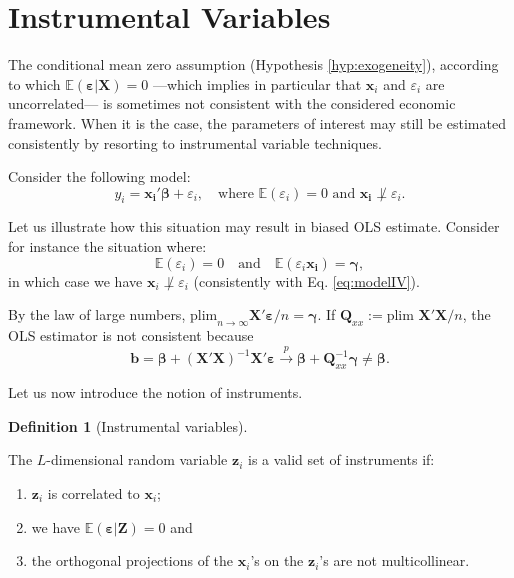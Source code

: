 \documentclass[
  12pt,
]{book}
\providecommand{\tightlist}{%
  \setlength{\itemsep}{0pt}\setlength{\parskip}{0pt}}
\theoremstyle{definition}
\newtheorem{definition}{Definition}[chapter]
\theoremstyle{definition}
\theoremstyle{definition}
\theoremstyle{definition}
\theoremstyle{remark}
\begin{document}
\hypertarget{IV}{%
\section{Instrumental Variables}\label{IV}}

The conditional mean zero assumption (Hypothesis \ref{hyp:exogeneity}), according to which \(\mathbb{E}(\boldsymbol\varepsilon|\mathbf{X})=0\) ---which implies in particular that \(\mathbf{x}_i\) and \(\varepsilon_i\) are uncorrelated--- is sometimes not consistent with the considered economic framework. When it is the case, the parameters of interest may still be estimated consistently by resorting to instrumental variable techniques.

Consider the following model:
\begin{equation}
y_i = \mathbf{x_i}'\boldsymbol\beta + \varepsilon_i, \quad \mbox{where } \mathbb{E}(\varepsilon_i)=0  \mbox{ and } \mathbf{x_i}\not\perp \varepsilon_i.\label{eq:modelIV}
\end{equation}

Let us illustrate how this situation may result in biased OLS estimate. Consider for instance the situation where:
\begin{equation}
\mathbb{E}(\varepsilon_i)=0 \quad \mbox{and} \quad \mathbb{E}(\varepsilon_i \mathbf{x_i})=\boldsymbol\gamma,\label{eq:exmIV}
\end{equation}
in which case we have \(\mathbf{x}_i\not\perp \varepsilon_i\) (consistently with Eq. \eqref{eq:modelIV}).

By the law of large numbers, \(\mbox{plim}_{n \rightarrow \infty} \mathbf{X}'\boldsymbol\varepsilon / n = \boldsymbol\gamma\). If \(\mathbf{Q}_{xx} := \mbox{plim } \mathbf{X}'\mathbf{X}/n\), the OLS estimator is not consistent because
\[
\mathbf{b} = \boldsymbol\beta + (\mathbf{X}'\mathbf{X})^{-1}\mathbf{X}'\boldsymbol\varepsilon \overset{p}{\rightarrow} \boldsymbol\beta + \mathbf{Q}_{xx}^{-1}\boldsymbol\gamma \ne \boldsymbol\beta.
\]

Let us now introduce the notion of instruments.

\begin{definition}[Instrumental variables]
\protect\hypertarget{def:instruments}{}\label{def:instruments}

The \(L\)-dimensional random variable \(\mathbf{z}_i\) is a valid set of instruments if:

\begin{enumerate}
\def\labelenumi{\alph{enumi}.}
\tightlist
\item
  \(\mathbf{z}_i\) is correlated to \(\mathbf{x}_i\);
\item
  we have \(\mathbb{E}(\boldsymbol\varepsilon|\mathbf{Z})=0\) and
\item
  the orthogonal projections of the \(\mathbf{x}_i\)'s on the \(\mathbf{z}_i\)'s are not multicollinear.
\end{enumerate}

\end{definition}
\end{document}
